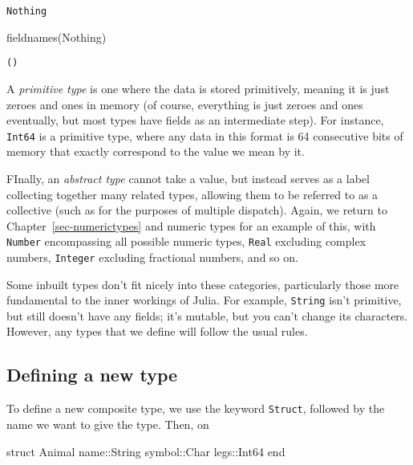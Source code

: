 \documentclass[
  letterpaper,
  DIV=11,
  numbers=noendperiod]{scrreprt}
\newenvironment{Shaded}{\begin{snugshade}}{\end{snugshade}}
\newcommand{\DataTypeTok}[1]{\textcolor[rgb]{0.68,0.00,0.00}{#1}}
\newcommand{\FunctionTok}[1]{\textcolor[rgb]{0.28,0.35,0.67}{#1}}
\newcommand{\KeywordTok}[1]{\textcolor[rgb]{0.00,0.23,0.31}{#1}}
\newcommand{\NormalTok}[1]{\textcolor[rgb]{0.00,0.23,0.31}{#1}}
\newcommand{\OperatorTok}[1]{\textcolor[rgb]{0.37,0.37,0.37}{#1}}
\begin{document}
\begin{verbatim}
Nothing
\end{verbatim}

\begin{Shaded}
\begin{Highlighting}[]
\FunctionTok{fieldnames}\NormalTok{(}\DataTypeTok{Nothing}\NormalTok{)}
\end{Highlighting}
\end{Shaded}

\begin{verbatim}
()
\end{verbatim}

A \emph{primitive type} is one where the data is stored primitively,
meaning it is just zeroes and ones in memory (of course, everything is
just zeroes and ones eventually, but most types have fields as an
intermediate step). For instance, \texttt{Int64} is a primitive type,
where any data in this format is 64 consecutive bits of memory that
exactly correspond to the value we mean by it.

FInally, an \emph{abstract type} cannot take a value, but instead serves
as a label collecting together many related types, allowing them to be
referred to as a collective (such as for the purposes of multiple
dispatch). Again, we return to Chapter~\ref{sec-numerictypes} and
numeric types for an example of this, with \texttt{Number} encompassing
all possible numeric types, \texttt{Real} excluding complex numbers,
\texttt{Integer} excluding fractional numbers, and so on.

Some inbuilt types don't fit nicely into these categories, particularly
those more fundamental to the inner workings of Julia. For example,
\texttt{String} isn't primitive, but still doesn't have any fields; it's
mutable, but you can't change its characters. However, any types that we
define will follow the usual rules.

\hypertarget{defining-a-new-type}{%
\subsection{Defining a new type}\label{defining-a-new-type}}

To define a new composite type, we use the keyword \texttt{Struct},
followed by the name we want to give the type. Then, on

\begin{Shaded}
\begin{Highlighting}[]
\KeywordTok{struct}\NormalTok{ Animal}
\NormalTok{    name}\OperatorTok{::}\DataTypeTok{String}
\NormalTok{    symbol}\OperatorTok{::}\DataTypeTok{Char}
\NormalTok{    legs}\OperatorTok{::}\DataTypeTok{Int64}
\KeywordTok{end}
\end{Highlighting}
\end{Shaded}
\end{document}
